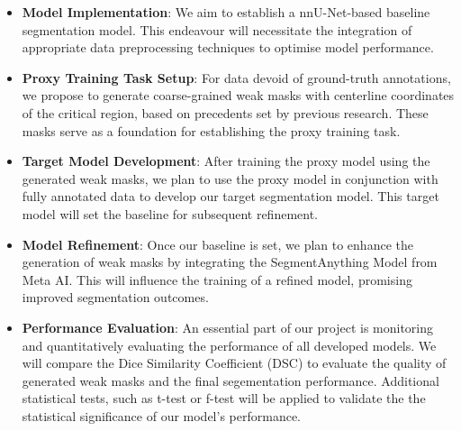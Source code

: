\begin{itemize}
\item \textbf{Model Implementation}: We aim to establish a nnU-Net-based baseline segmentation model. This endeavour will necessitate the integration of appropriate data preprocessing techniques to optimise model performance.

\item \textbf{Proxy Training Task Setup}: For data devoid of ground-truth annotations, we propose to generate coarse-grained weak masks with centerline coordinates of the critical region, based on precedents set by previous research. These masks serve as a foundation for establishing the proxy training task.

\item \textbf{Target Model Development}: After training the proxy model using the generated weak masks, we plan to use the proxy model in conjunction with fully annotated data to develop our target segmentation model. This target model will set the baseline for subsequent refinement.

\item \textbf{Model Refinement}: Once our baseline is set, we plan to enhance the generation of weak masks by integrating the SegmentAnything Model \cite{kirillov2023segany} from Meta AI. This will influence the training of a refined model, promising improved segmentation outcomes.

\item \textbf{Performance Evaluation}: An essential part of our project is monitoring and quantitatively evaluating the performance of all developed models. We will compare the Dice Similarity Coefficient (DSC) to evaluate the quality of generated weak masks and the final segementation performance. Additional statistical tests, such as t-test or f-test will be applied to validate the the statistical significance of our model's performance. 
\end{itemize}